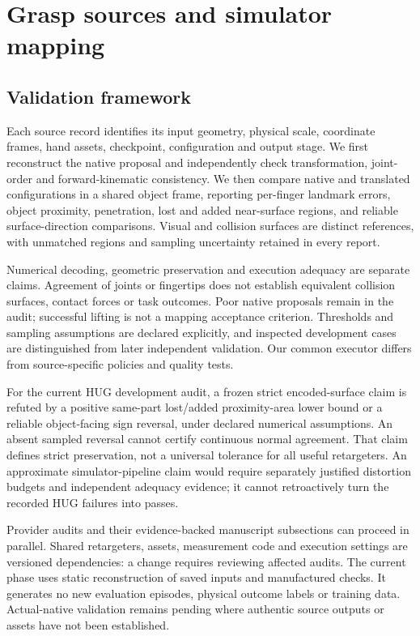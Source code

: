\documentclass[10pt,letterpaper]{article}
\begin{document}
\section{Grasp sources and simulator mapping}
\subsection{Validation framework}
Each source record identifies its input geometry, physical scale, coordinate
frames, hand assets, checkpoint, configuration and output stage. We first
reconstruct the native proposal and independently check transformation,
joint-order and forward-kinematic consistency. We then compare native and
translated configurations in a shared object frame, reporting per-finger
landmark errors, object proximity, penetration, lost and added near-surface
regions, and reliable surface-direction comparisons. Visual and collision
surfaces are distinct references, with unmatched regions and sampling uncertainty
retained in every report.

Numerical decoding, geometric preservation and execution adequacy are separate
claims. Agreement of joints or fingertips does not establish equivalent
collision surfaces, contact forces or task outcomes. Poor native proposals
remain in the audit; successful lifting is not a mapping acceptance criterion.
Thresholds and sampling assumptions are declared explicitly, and inspected
development cases are distinguished from later independent validation.
Our common executor differs from source-specific policies and quality tests.

For the current HUG development audit, a frozen strict encoded-surface claim
is refuted by a positive same-part lost/added proximity-area lower bound or a
reliable object-facing sign reversal, under declared numerical assumptions.
An absent sampled reversal cannot certify continuous normal agreement. That
claim defines strict preservation, not a universal tolerance for all useful
retargeters. An approximate simulator-pipeline claim would require separately
justified distortion budgets and independent adequacy evidence; it cannot
retroactively turn the recorded HUG failures into passes.

Provider audits and their evidence-backed manuscript subsections can proceed
in parallel. Shared retargeters, assets, measurement code and execution settings
are versioned dependencies: a change requires reviewing affected audits.
The current phase uses static reconstruction of saved inputs and manufactured
checks. It generates no new evaluation episodes, physical outcome labels or
training data. Actual-native validation remains pending where authentic source
outputs or assets have not been established.
\end{document}
